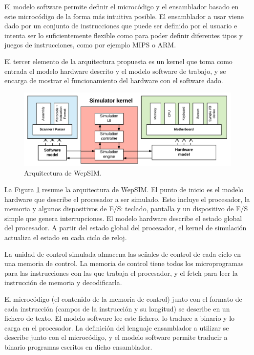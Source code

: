 El modelo software permite definir el microcódigo y el ensamblador basado en este microcódigo de la forma más intuitiva posible. El ensamblador a usar viene dado por un conjunto de instrucciones que puede ser definido por el usuario e intenta ser lo suficientemente flexible como para poder definir diferentes tipos y juegos de instrucciones, como por ejemplo MIPS o ARM.

El tercer elemento de la arquitectura propuesta es un kernel que toma como entrada el modelo hardware descrito y el modelo software de trabajo, y se encarga de mostrar el funcionamiento del hardware con el software dado.

\begin{figure}[htbp]
 	\centering
 	\includegraphics[width=14cm]{figures/architecture_diagram}
 	\caption{Arquitectura de WepSIM.}
	\label{fig:architecture_diagram}
\end{figure}

La Figura \ref{fig:architecture_diagram} resume la arquitectura de WepSIM. El punto de inicio es el modelo hardware que describe el procesador a ser simulado. Esto incluye el procesador, la memoria y algunos dispositivos de E/S: teclado, pantalla y un dispositivo de E/S simple que genera interrupciones. El modelo hardware describe el estado global del procesador. A partir del estado global del procesador, el kernel de simulación actualiza el estado en cada ciclo de reloj.

La unidad de control simulada almacena las señales de control de cada ciclo en una memoria de control. La memoria de control tiene todos los microprogramas para las instrucciones con las que trabaja el procesador, y el fetch para leer la instrucción de memoria y decodificarla.


El microcódigo (el contenido de la memoria de control) junto con el formato de cada instrucción (campos de la instrucción y su longitud) se describe en un fichero de texto. El modelo software lee este fichero, lo traduce a binario y lo carga en el procesador. La definición del lenguaje ensamblador a utilizar se describe junto con el microcódigo, y el modelo software permite traducir a binario programas escritos en dicho ensamblador.


